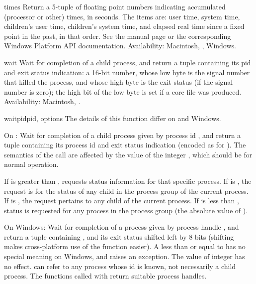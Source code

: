 \begin{funcdesc}{times}{}
Return a 5-tuple of floating point numbers indicating accumulated
(processor or other)
times, in seconds.  The items are: user time, system time, children's
user time, children's system time, and elapsed real time since a fixed
point in the past, in that order.  See the \UNIX{} manual page
 or the corresponding Windows Platform API
documentation.
Availability: Macintosh, \UNIX, Windows.
\end{funcdesc}

\begin{funcdesc}{wait}{}
Wait for completion of a child process, and return a tuple containing
its pid and exit status indication: a 16-bit number, whose low byte is
the signal number that killed the process, and whose high byte is the
exit status (if the signal number is zero); the high bit of the low
byte is set if a core file was produced.
Availability: Macintosh, \UNIX.
\end{funcdesc}

\begin{funcdesc}{waitpid}{pid, options}
The details of this function differ on \UNIX{} and Windows.

On \UNIX:
Wait for completion of a child process given by process id ,
and return a tuple containing its process id and exit status
indication (encoded as for ).  The semantics of the
call are affected by the value of the integer , which
should be  for normal operation.

If  is greater than ,  requests
status information for that specific process.  If  is
, the request is for the status of any child in the process
group of the current process.  If  is , the request
pertains to any child of the current process.  If  is less
than , status is requested for any process in the process
group  (the absolute value of ).

On Windows:
Wait for completion of a process given by process handle ,
and return a tuple containing ,
and its exit status shifted left by 8 bits (shifting makes cross-platform
use of the function easier).
A  less than or equal to  has no special meaning on
Windows, and raises an exception.
The value of integer  has no effect.
 can refer to any process whose id is known, not necessarily a
child process.
The  functions called with 
return suitable process handles.
\end{funcdesc}

